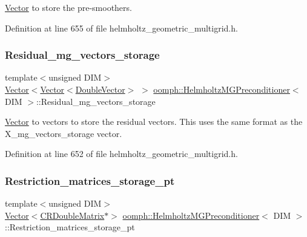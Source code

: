 \hyperlink{classoomph_1_1Vector}{Vector} to store the pre-\/smoothers. 



Definition at line 655 of file helmholtz\+\_\+geometric\+\_\+multigrid.\+h.

\mbox{\label{classoomph_1_1HelmholtzMGPreconditioner_a9fb9b1da7264ccfa054a6d57120e5568}} 
\subsubsection{\texorpdfstring{Residual\+\_\+mg\+\_\+vectors\+\_\+storage}{Residual\_mg\_vectors\_storage}}
{\footnotesize\ttfamily template$<$unsigned D\+IM$>$ \\
\hyperlink{classoomph_1_1Vector}{Vector}$<$\hyperlink{classoomph_1_1Vector}{Vector}$<$\hyperlink{classoomph_1_1DoubleVector}{Double\+Vector}$>$ $>$ \hyperlink{classoomph_1_1HelmholtzMGPreconditioner}{oomph\+::\+Helmholtz\+M\+G\+Preconditioner}$<$ D\+IM $>$\+::Residual\+\_\+mg\+\_\+vectors\+\_\+storage\hspace{0.3cm}{\ttfamily [private]}}



\hyperlink{classoomph_1_1Vector}{Vector} to vectors to store the residual vectors. This uses the same format as the X\+\_\+mg\+\_\+vectors\+\_\+storage vector. 



Definition at line 652 of file helmholtz\+\_\+geometric\+\_\+multigrid.\+h.

\mbox{\label{classoomph_1_1HelmholtzMGPreconditioner_a4a268a461998cabc0b65e256ee6a039f}} 
\subsubsection{\texorpdfstring{Restriction\+\_\+matrices\+\_\+storage\+\_\+pt}{Restriction\_matrices\_storage\_pt}}
{\footnotesize\ttfamily template$<$unsigned D\+IM$>$ \\
\hyperlink{classoomph_1_1Vector}{Vector}$<$\hyperlink{classoomph_1_1CRDoubleMatrix}{C\+R\+Double\+Matrix}$\ast$$>$ \hyperlink{classoomph_1_1HelmholtzMGPreconditioner}{oomph\+::\+Helmholtz\+M\+G\+Preconditioner}$<$ D\+IM $>$\+::Restriction\+\_\+matrices\+\_\+storage\+\_\+pt\hspace{0.3cm}{\ttfamily [private]}}



